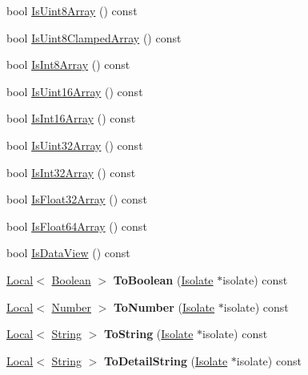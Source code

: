 \begin{DoxyCompactItemize}
bool \hyperlink{classv8_1_1Value_acbe2cd9c9cce96ee498677ba37c8466d}{Is\+Uint8\+Array} () const 
\item 
bool \hyperlink{classv8_1_1Value_ad3cb464ab5ef0215bd2cbdd4eb2b7e3d}{Is\+Uint8\+Clamped\+Array} () const 
\item 
bool \hyperlink{classv8_1_1Value_a10a88a2794271dfcd9c3abd565e8f28a}{Is\+Int8\+Array} () const 
\item 
bool \hyperlink{classv8_1_1Value_a4a45fabf58b241f5de3086a3dd0a09ae}{Is\+Uint16\+Array} () const 
\item 
bool \hyperlink{classv8_1_1Value_a928c586639dd75ae4efdaa66b1fc4d50}{Is\+Int16\+Array} () const 
\item 
bool \hyperlink{classv8_1_1Value_a5e39229dc74d534835cf4ceba10676f4}{Is\+Uint32\+Array} () const 
\item 
bool \hyperlink{classv8_1_1Value_a48eac78a49c8b42d9f8cf05c514b3750}{Is\+Int32\+Array} () const 
\item 
bool \hyperlink{classv8_1_1Value_a4effc7ca1a221dd8c1e23c0f28145ef0}{Is\+Float32\+Array} () const 
\item 
bool \hyperlink{classv8_1_1Value_a293f140b81b0219d1497e937ed948b1e}{Is\+Float64\+Array} () const 
\item 
bool \hyperlink{classv8_1_1Value_afd20ab51e79658acc405c12dad2260ab}{Is\+Data\+View} () const 
\item 
\hypertarget{classv8_1_1Value_a1aa4f442454e92eda328204ec70ce11a}{}\hyperlink{classv8_1_1Local}{Local}$<$ \hyperlink{classv8_1_1Boolean}{Boolean} $>$ {\bfseries To\+Boolean} (\hyperlink{classv8_1_1Isolate}{Isolate} $\ast$isolate) const \label{classv8_1_1Value_a1aa4f442454e92eda328204ec70ce11a}

\item 
\hypertarget{classv8_1_1Value_a611ba21fc6426d42ab473f0ac3f98e90}{}\hyperlink{classv8_1_1Local}{Local}$<$ \hyperlink{classv8_1_1Number}{Number} $>$ {\bfseries To\+Number} (\hyperlink{classv8_1_1Isolate}{Isolate} $\ast$isolate) const \label{classv8_1_1Value_a611ba21fc6426d42ab473f0ac3f98e90}

\item 
\hypertarget{classv8_1_1Value_a607e56c1506456b049e72ea298b9e216}{}\hyperlink{classv8_1_1Local}{Local}$<$ \hyperlink{classv8_1_1String}{String} $>$ {\bfseries To\+String} (\hyperlink{classv8_1_1Isolate}{Isolate} $\ast$isolate) const \label{classv8_1_1Value_a607e56c1506456b049e72ea298b9e216}

\item 
\hypertarget{classv8_1_1Value_a9521719309db0d304442502063be6b13}{}\hyperlink{classv8_1_1Local}{Local}$<$ \hyperlink{classv8_1_1String}{String} $>$ {\bfseries To\+Detail\+String} (\hyperlink{classv8_1_1Isolate}{Isolate} $\ast$isolate) const \label{classv8_1_1Value_a9521719309db0d304442502063be6b13}


\end{DoxyCompactItemize}
